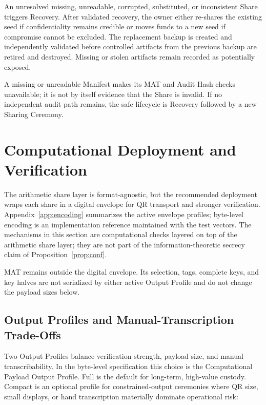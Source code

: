 \documentclass[11pt]{article}
\begin{document}
An unresolved missing, unreadable, corrupted, substituted, or inconsistent Share triggers Recovery. After validated recovery, the owner either re-shares the existing seed if confidentiality remains credible or moves funds to a new seed if compromise cannot be excluded. The replacement backup is created and independently validated before controlled artifacts from the previous backup are retired and destroyed. Missing or stolen artifacts remain recorded as potentially exposed.

A missing or unreadable Manifest makes its MAT and Audit Hash checks unavailable; it is not by itself evidence that the Share is invalid. If no independent audit path remains, the safe lifecycle is Recovery followed by a new Sharing Ceremony.

\section{Computational Deployment and Verification}
\label{sec:digital-envelope}

The arithmetic share layer is format-agnostic, but the recommended deployment wraps each share in a digital envelope for QR transport and stronger verification. Appendix~\ref{app:encoding} summarizes the active envelope profiles; byte-level encoding is an implementation reference maintained with the test vectors. The mechanisms in this section are computational checks layered on top of the arithmetic share layer; they are not part of the information-theoretic secrecy claim of Proposition~\ref{prop:conf}.

MAT remains outside the digital envelope. Its selection, tags, complete keys, and key halves are not serialized by either active Output Profile and do not change the payload sizes below.

\subsection{Output Profiles and Manual-Transcription Trade-Offs}
\label{sec:modes}

Two Output Profiles balance verification strength, payload size, and manual transcribability. In the byte-level specification this choice is the Computational Payload Output Profile. Full is the default for long-term, high-value custody. Compact is an optional profile for constrained-output ceremonies where QR size, small displays, or hand transcription materially dominate operational risk:
\end{document}

